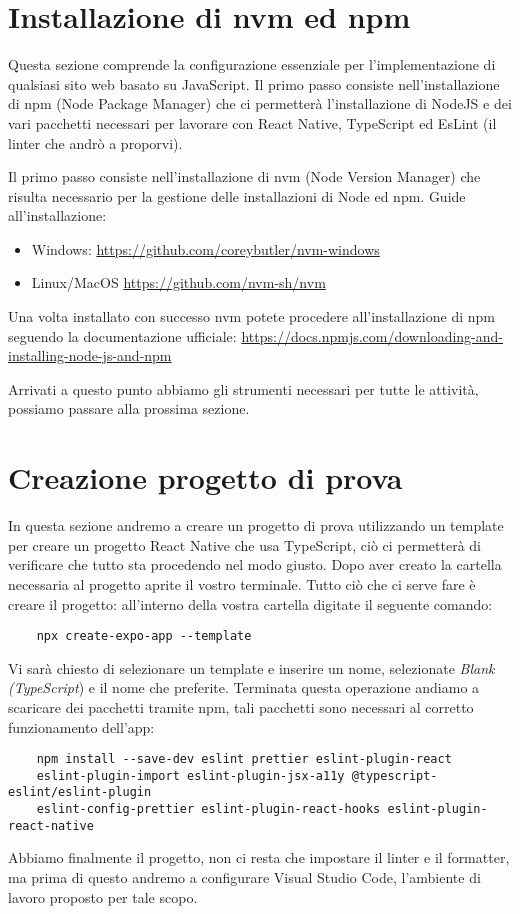 \section{Installazione di nvm ed npm}
Questa sezione comprende la configurazione essenziale per l'implementazione di
qualsiasi sito web basato su JavaScript. Il primo passo consiste nell'installazione
di npm (Node Package Manager) che ci permetterà l'installazione di NodeJS e dei vari pacchetti necessari per lavorare con React Native, TypeScript ed EsLint (il linter che andrò a proporvi).

Il primo passo consiste nell'installazione di nvm (Node Version Manager) che risulta necessario per la gestione delle installazioni di Node ed npm. Guide
all'installazione:
\begin{itemize}
    \item Windows: \url{https://github.com/coreybutler/nvm-windows}
    \item Linux/MacOS \url{https://github.com/nvm-sh/nvm}
\end{itemize}

Una volta installato con successo nvm potete procedere all'installazione di npm seguendo la documentazione ufficiale: \url{https://docs.npmjs.com/downloading-and-installing-node-js-and-npm}

\bigskip

Arrivati a questo punto abbiamo gli strumenti necessari per tutte le attività, possiamo passare alla prossima sezione.

\section{Creazione progetto di prova}
In questa sezione andremo a creare un progetto di prova utilizzando un template per creare un progetto React Native che usa TypeScript, ciò ci permetterà di verificare che tutto sta procedendo nel modo giusto. Dopo aver creato la cartella necessaria al progetto aprite il vostro terminale. Tutto ciò che ci serve fare è creare il progetto: all'interno della vostra cartella digitate il seguente comando:
\begin{verbatim}
    npx create-expo-app --template
\end{verbatim}
Vi sarà chiesto di selezionare un template e inserire un nome, selezionate \textit{Blank (TypeScript}) e il nome che preferite.
Terminata questa operazione andiamo a scaricare dei pacchetti tramite npm, tali pacchetti sono necessari al corretto funzionamento dell'app:
\begin{verbatim}
    npm install --save-dev eslint prettier eslint-plugin-react
    eslint-plugin-import eslint-plugin-jsx-a11y @typescript-eslint/eslint-plugin
    eslint-config-prettier eslint-plugin-react-hooks eslint-plugin-react-native
\end{verbatim}
Abbiamo finalmente il progetto, non ci resta che impostare il linter e il formatter, ma prima di questo andremo a configurare Visual Studio Code, l'ambiente di lavoro proposto per tale scopo.

